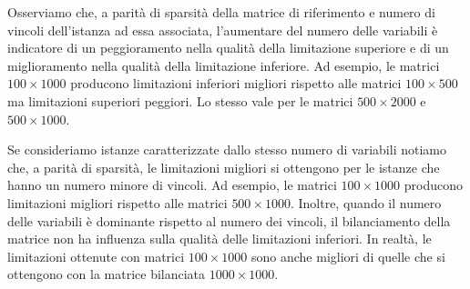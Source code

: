 Osserviamo che, a parità di sparsità della matrice di riferimento e numero di vincoli dell'istanza ad essa associata,
l'aumentare del numero delle variabili è indicatore di un peggioramento nella qualità della limitazione superiore e di
un miglioramento nella qualità della limitazione inferiore. Ad esempio, le matrici \( 100\times 1000 \) producono
limitazioni inferiori migliori rispetto alle matrici \( 100\times 500 \) ma limitazioni superiori peggiori. Lo stesso
vale per le matrici \( 500\times 2000 \) e  \( 500\times 1000 \).

Se consideriamo istanze caratterizzate dallo stesso numero di variabili notiamo che, a parità di
sparsità, le limitazioni migliori si ottengono per le istanze che hanno un numero minore di vincoli. Ad esempio, le
matrici \( 100\times 1000 \) producono limitazioni migliori rispetto alle matrici \( 500\times 1000 \). Inoltre, quando
il numero delle variabili è dominante rispetto al numero dei vincoli, il bilanciamento della matrice non ha influenza
sulla qualità delle limitazioni inferiori. In realtà, le limitazioni ottenute con matrici \( 100\times 1000 \) sono
anche migliori di quelle che si ottengono con la matrice bilanciata  \( 1000\times 1000 \).



